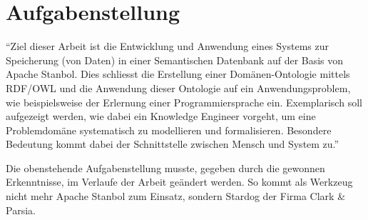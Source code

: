 \chapter{Aufgabenstellung}
\label{chap:Aufgabenstellung}


``Ziel dieser Arbeit ist die Entwicklung und Anwendung eines Systems zur Speicherung (von Daten) in einer Semantischen Datenbank auf der Basis von Apache Stanbol. Dies schliesst die Erstellung einer Domänen-Ontologie mittels RDF/OWL und die Anwendung dieser Ontologie auf ein Anwendungsproblem, wie beispielsweise der Erlernung einer Programmiersprache ein. Exemplarisch soll aufgezeigt werden, wie dabei ein Knowledge Engineer vorgeht, um eine Problemdomäne systematisch zu modellieren und formalisieren. Besondere Bedeutung kommt dabei der Schnittstelle zwischen Mensch und System zu.''~\cite{Aufgabenstellung}

Die obenstehende Aufgabenstellung musste, gegeben durch die gewonnen Erkenntnisse, im Verlaufe der Arbeit geändert werden. So kommt als Werkzeug nicht mehr Apache Stanbol zum Einsatz, sondern Stardog der Firma Clark \& Parsia.
